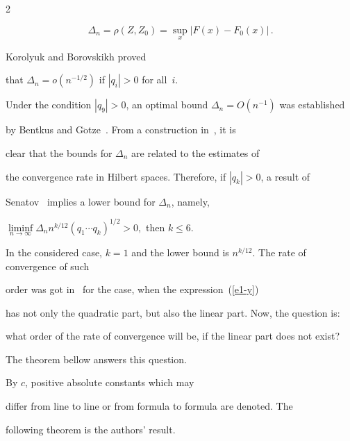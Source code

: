 \begin{multicols}{2}
     

     \noindent

     \begin{equation*}


    \Delta_{n}=\rho(Z,Z_0)=\sup\limits_{x}|F(x)-F_0(x)|\,.

    \end{equation*}



    Korolyuk and Borovskikh proved~\cite{3-y} 

    that $\Delta_{n}$\linebreak $ =o(n^{-1/2})$ if $|q_i| >0$ for all~$i$.

    Under the condition $|q_9| >0$, an optimal bound $\Delta_{n} =O(n^{-1})$ was established

    by Bentkus and G$\ddot{\mbox{o}}$tze~\cite{1-y}. From a construction in~\cite{1-y}, it is

    clear that the bounds for $\Delta_{n}$ are related to the estimates of

    the convergence rate in Hilbert spaces. Therefore, if $|q_k| >0$, a result of

    Senatov~\cite{6-y} implies a lower bound for $\Delta_{n}$, namely,

    $\liminf\limits_{n\rightarrow\infty}\Delta_{n}n^{k/12}(q_1\cdots q_k)^{1/2} >0,$ then $k \leq6$. 

    In the considered case, $k =1$ and the lower bound is $n^{k/12}$. The rate of convergence of such 

    order was got in~\cite{9-y} for the case, when the expression~(\ref{e1-y}) 

    has not only the quadratic part, but also the linear part. Now, the question is: 

    what order of the rate of convergence will be, if the linear part does not exist? 

    The theorem bellow answers this question.



    By $c$, positive absolute constants which may

    differ from line to line or from formula to formula are denoted. The 

    following theorem is the authors' result.

    

\smallskip



\noindent


\end{multicols}
